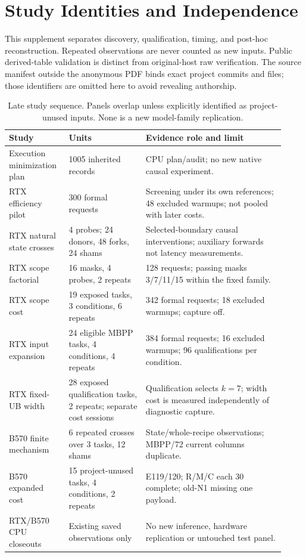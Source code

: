 \documentclass{article}
\begin{document}
\printAffiliationsAndNotice{}
\section{Study Identities and Independence}
This supplement separates discovery, qualification, timing, and post-hoc reconstruction. Repeated observations are never counted as new inputs. Public derived-table validation is distinct from original-host raw verification. The source manifest outside the anonymous PDF binds exact project commits and files; those identifiers are omitted here to avoid revealing authorship.

\begin{table}[t]\centering\small
\caption{Late study sequence. Panels overlap unless explicitly identified as project-unused inputs. None is a new model-family replication.}
\begin{tabular}{p{0.19\linewidth}p{0.26\linewidth}p{0.47\linewidth}}\toprule
Study & Units & Evidence role and limit\\\midrule
Execution minimization plan & 1005 inherited records & CPU plan/audit; no new native causal experiment.\\
RTX efficiency pilot & 300 formal requests & Screening under its own references; 48 excluded warmups; not pooled with later costs.\\
RTX natural state crosses & 4 probes; 24 donors, 48 forks, 24 shams & Selected-boundary causal interventions; auxiliary forwards not latency measurements.\\
RTX scope factorial & 16 masks, 4 probes, 2 repeats & 128 requests; passing masks 3/7/11/15 within the fixed family.\\
RTX scope cost & 19 exposed tasks, 3 conditions, 6 repeats & 342 formal requests; 18 excluded warmups; capture off.\\
RTX input expansion & 24 eligible MBPP tasks, 4 conditions, 4 repeats & 384 formal requests; 16 excluded warmups; 96 qualifications per condition.\\
RTX fixed-UB width & 28 exposed qualification tasks, 2 repeats; separate cost sessions & Qualification selects $k=7$; width cost is measured independently of diagnostic capture.\\
B570 finite mechanism & 6 repeated crosses over 3 tasks, 12 shams & State/whole-recipe observations; MBPP/72 current columns duplicate.\\
B570 expanded cost & 15 project-unused tasks, 4 conditions, 2 repeats & E119/120; R/M/C each 30 complete; old-N1 missing one payload.\\
RTX/B570 CPU closeouts & Existing saved observations only & No new inference, hardware replication or untouched test panel.\\\bottomrule
\end{tabular}\end{table}
\end{document}
